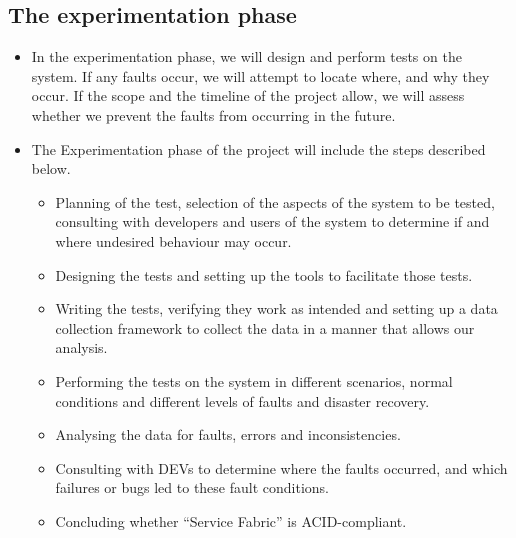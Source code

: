 \subsection{The experimentation phase}
\begin{itemize}
\item	In the experimentation phase, we will design and perform tests on the system. If any faults occur, we will attempt to locate where, and why they occur. If the scope and the timeline of the project allow, we will assess whether we prevent the faults from occurring in the future.
\item	The Experimentation phase of the project will include the steps described below. 
\begin{itemize}
\item	Planning of the test, selection of the aspects of the system to be tested, consulting with developers and users of the system to determine if and where undesired behaviour may occur.
\item	Designing the tests and setting up the tools to facilitate those tests.
\item	Writing the tests, verifying they work as intended and setting up a data collection framework to collect the data in a manner that allows our analysis.
\item	Performing the tests on the system in different scenarios, normal conditions and different levels of faults and disaster recovery.
\item	Analysing the data for faults, errors and inconsistencies.
\item	Consulting with DEVs to determine where the faults occurred, and which failures or bugs led to these fault conditions.
\item	Concluding whether “Service Fabric” is ACID-compliant. 
\end{itemize}
\end{itemize}
